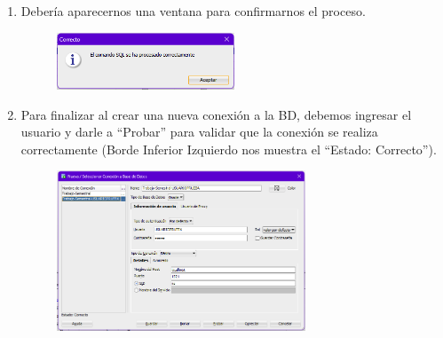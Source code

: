 \documentclass{templateNote}
\begin{document}
\begin{enumerate}
    \item Debería aparecernos una ventana para confirmarnos el proceso.
    \begin{figure}[H]
        \centering
        \includegraphics[width=0.5\textwidth]{img/image5.png}
    \end{figure}

    \item Para finalizar al crear una nueva conexión a la BD, debemos ingresar el usuario y darle a “Probar” para validar que la conexión se realiza correctamente (Borde Inferior Izquierdo nos muestra el “Estado: Correcto”).
    \begin{figure}[H]
        \centering
        \includegraphics[width=0.7\textwidth]{img/image6.png}
    \end{figure}
\end{enumerate}
\end{document}
